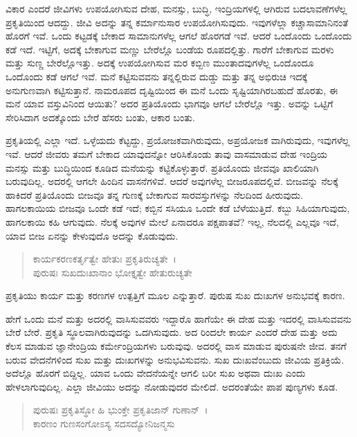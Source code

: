 ವಿಕಾರ ಎಂದರೆ ಜೀವಿಗಳು ಉಪಯೋಗಿಸುವ ದೇಹ, ಮನಸ್ಸು, ಬುದ್ಧಿ, ಇಂದ್ರಿಯಗಳಲ್ಲಿ ಆಗಿರುವ ಬದಲಾವಣೆಗಳೆಲ್ಲ ಪ್ರಕೃತಿಯಿಂದ ಆದದ್ದು. ಜೀವಿ ಅದನ್ನು ತನ್ನ ಕರ್ಮಾನುಸಾರ ಉಪಯೋಗಿಸುವುದು. ಇವುಗಳೆಲ್ಲಾ ಕಚ್ಚಾಸಾಮಾನಿನಂತೆ ಹೊರಗೆ ಇವೆ. ಒಂದು ಕಟ್ಟಡಕ್ಕೆ ಬೇಕಾದ ಸಾಮಾನುಗಳೆಲ್ಲ ಆಗಲೆ ಹೊರಗಡೆ ಇವೆ. ಆದರೆ ಒಂದೊಂದು ಒಂದೊಂದು ಕಡೆ ಇದೆ. ಇಟ್ಟಿಗೆ, ಅದಕ್ಕೆ ಬೇಕಾಗುವ ಮಣ್ಣು ಬೇರೆಲ್ಲೊ ಬಂಡೆಯ ರೂಪದಲ್ಲಿತ್ತು. ಗಾರೆಗೆ ಬೇಕಾಗುವ ಮರಳು ಮತ್ತು ಸುಣ್ಣ ಬೇರೆಲ್ಲೊಇತ್ತು. ಅದಕ್ಕೆ ಉಪಯೋಗಿಸುವ ಮರ ಕಬ್ಬಿಣ ಮುಂತಾದವುಗಳೆಲ್ಲ ಒಂದೊಂದೂ ಒಂದೊಂದು ಕಡೆ ಆಗಲೆ ಇವೆ. ಮನೆ ಕಟ್ಟಿಸುವವನು ತನ್ನಲ್ಲಿರುವ ದುಡ್ಡು ಮತ್ತು ತನ್ನ ಅಭಿರುಚಿ ಇದಕ್ಕೆ ಅನುಗುಣವಾಗಿ ಕಟ್ಟಿಸುತ್ತಾನೆ. ನಾಮರೂಪದ ದೃಷ್ಟಿಯಿಂದ ಈ ಮನೆ ಒಂದು ಸೃಷ್ಟಿಯಾಗಿರಬಹುದೆ ಹೊರತು, ಈ ಮನೆ ಯಾವ ವಸ್ತುವಿನಿಂದ ಆಯಿತು? ಅದರ ಪ್ರತಿಯೊಂದು ಭಾಗವೂ ಆಗಲೆ ಬೇರೆಲ್ಲೊ ಇತ್ತು. ಅವನ್ನು ಒಟ್ಟಿಗೆ ಸೇರಿಸಿದಾಗ ಅದಕ್ಕೊಂದು ಬೇರೆ ಹೆಸರು ಬಂತು, ಆಕಾರ ಬಂತು.

ಪ್ರಕೃತಿಯಲ್ಲಿ ಎಲ್ಲಾ ಇದೆ. ಒಳ್ಳೆಯದು ಕೆಟ್ಟದ್ದು, ಪ್ರಯೋಜಕವಾಗಿರುವುದು, ಅಪ್ರಯೋಜಕ ವಾಗಿರುವುದು, ಇವುಗಳೆಲ್ಲ ಇವೆ. ಆದರೆ ಜೀವರು ತಮಗೆ ಬೇಕಾದ ಯಾವುದನ್ನೋ ಆರಿಸಿಕೊಂಡು ತಾವು ವಾಸಮಾಡುವ ದೇಹ ಇಂದ್ರಿಯ ಮನಸ್ಸು ಮತ್ತು ಬುದ್ಧಿಯಿಂದ ಕೂಡಿದ ಮನೆಯನ್ನು ಕಟ್ಟಿಕೊಳ್ಳುತ್ತಾರೆ. ಪ್ರತಿಯೊಂದು ಜೀವವೂ ಖಾಲಿಯಾಗಿ ಬರುವುದಿಲ್ಲ. ಅದರಲ್ಲಿ ಆಗಲೇ ಹಿಂದಿನ ವಾಸನೆಗಳಿವೆ. ಆದರೆ ಅವುಗಳೆಲ್ಲ ಬೀಜರೂಪದಲ್ಲಿವೆ. ಬೀಜವನ್ನು ನೆಲಕ್ಕೆ ಹಾಕಿದರೆ ಪ್ರತಿಯೊಂದು ಬೀಜವೂ ತನ್ನ ಗುಣಕ್ಕೆ ಬೇಕಾಗುವ ಸಾರವಸ್ತುಗಳನ್ನು ನೆಲದಿಂದ ಹೀರುವುದು. ಹಾಗಲಕಾಯಿಯ ಬೀಜವೂ ಒಂದೇ ಕಡೆ ಇದೆ; ಕಬ್ಬಿನ ಸಸಿಯೂ ಒಂದೇ ಕಡೆ ಬೆಳೆಯುತ್ತಿದೆ. ಕಬ್ಬು ಸಿಹಿಯಾಗುವುದು, ಹಾಗಲಕಾಯಿ ಕಹಿ ಆಗುವುದು. ನೆಲಕ್ಕೆ ಅವುಗಳ ಮೇಲೆ ಏನಾದರೂ ಪಕ್ಷಪಾತವೆ? ಇಲ್ಲ, ನೆಲದಲ್ಲಿ ಎಲ್ಲವೂ ಇದೆ, ಯಾವ ಬೀಜ ಏನನ್ನು ಕೇಳುವುದೊ ಅದನ್ನು ಕೊಡುವುದು.

\begin{verse}
ಕಾರ್ಯಕರಣಕರ್ತೃತ್ವೇ ಹೇತುಃ ಪ್ರಕೃತಿರುಚ್ಯತೇ~।\\ಪುರುಷಃ ಸುಖದುಃಖಾನಾಂ ಭೋಕ್ತೃತ್ವೇ ಹೇತುರುಚ್ಯತೇ 
\end{verse}

{\small ಪ್ರಕೃತಿಯು ಕಾರ್ಯ ಮತ್ತು ಕರಣಗಳ ಉತ್ಪತ್ತಿಗೆ ಮೂಲ ಎನ್ನುತ್ತಾರೆ. ಪುರುಷ ಸುಖ ದುಃಖಗಳ ಅನುಭವಕ್ಕೆ ಕಾರಣ.}

ಹೇಗೆ ಒಂದು ಮನೆ ಮತ್ತು ಅದರಲ್ಲಿ ವಾಸಿಸುವವರು ಇದ್ದಾರೊ ಹಾಗೆಯೇ ಈ ದೇಹ ಮತ್ತು ಇದರಲ್ಲಿ ವಾಸಿಸುವವನು ಬೇರೆ ಬೇರೆ. ಪ್ರಕೃತಿ ಸ್ಥೂಲವಾಗಿರುವುದನ್ನು ಒದಗಿಸುವುದು. ಅದ ರಿಂದಲೇ ಕಾರ್ಯ ಎಂದರೆ ದೇಹ ಮತ್ತು ಅದು ಕೆಲಸ ಮಾಡುವ ಜ್ಞಾನೇಂದ್ರಿಯ ಕರ್ಮೇಂದ್ರಿಯಗಳು ಬರುವುವು. ಅದರಲ್ಲಿ ವಾಸ ಮಾಡುವ ಪುರುಷನೇ ಜೀವ. ತನಗೆ ಬರುವ ವೇದನೆಗಳಿಂದ ಸುಖ ಮತ್ತು ದುಃಖಗಳನ್ನು ಅನುಭವಿಸುವನು. ಸುಖ ದುಃಖವೆಂಬುದು ಜೀವಿಯ ಪ್ರತಿಕ್ರಿಯೆ. ಅದೆಲ್ಲೊ ಹೊರಗೆ ಬಿದ್ದಿಲ್ಲ. ಯಾವ ಒಂದು ವೇದನೆಯನ್ನೇ ಆಗಲಿ ಬರೀ ಸುಖ ಅಥವಾ ದುಃಖ ಎಂದು ಹೇಳಲಾಗುವುದಿಲ್ಲ. ಎಲ್ಲಾ ಜೀವಿಯು ಅದನ್ನು ನೋಡುವುದರ ಮೇಲಿದೆ. ಅದರಂತೆಯೇ ಪಾಪ ಪುಣ್ಯಗಳು ಕೂಡ.

\begin{verse}
ಪುರುಷಃ ಪ್ರಕೃತಿಸ್ಥೋ ಹಿ ಭುಂಕ್ತೇ ಪ್ರಕೃತಿಜಾನ್ ಗುಣಾನ್~।\\ಕಾರಣಂ ಗುಣಸಂಗೋಽಸ್ಯ ಸದಸದ್ಯೋನಿಜನ್ಮಸು 
\end{verse}

